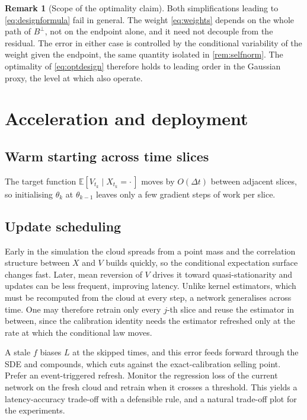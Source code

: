 \documentclass[11pt,a4paper]{article}
\theoremstyle{plain}
\theoremstyle{definition}
\theoremstyle{definition}
\newtheorem{remark}[theorem]{Remark}
\newcommand{\E}{\mathbb{E}}
\newcommand{\Lev}{L}
\begin{document}
\begin{remark}[Scope of the optimality claim]\label{rem:optscope}
Both simplifications leading to \cref{eq:designformula} fail in general. The weight \cref{eq:weights} depends on the whole path of $B^\perp$, not on the endpoint alone, and it need not decouple from the residual. The error in either case is controlled by the conditional variability of the weight given the endpoint, the same quantity isolated in \cref{rem:selfnorm}. The optimality of \cref{eq:optdesign} therefore holds to leading order in the Gaussian proxy, the level at which \citet{dosreis2023} also operate.
\end{remark}

\section{Acceleration and deployment}\label{sec:warmstart}

\subsection{Warm starting across time slices}

The target function $\E[V_{t_k} \mid X_{t_k} = \cdot\,]$ moves by $O(\Delta t)$ between adjacent slices, so initialising $\theta_k$ at $\theta_{k-1}$ leaves only a few gradient steps of work per slice.

\subsection{Update scheduling}\label{subsec:scheduling}

Early in the simulation the cloud spreads from a point mass and the correlation structure between $X$ and $V$ builds quickly, so the conditional expectation surface changes fast. Later, mean reversion of $V$ drives it toward quasi-stationarity and updates can be less frequent, improving latency. Unlike kernel estimators, which must be recomputed from the cloud at every step, a network generalises across time. One may therefore retrain only every $j$-th slice and reuse the estimator in between, since the calibration identity needs the estimator refreshed only at the rate at which the conditional law moves.

A stale $f$ biases $\Lev$ at the skipped times, and this error feeds forward through the SDE and compounds, which cuts against the exact-calibration selling point. Prefer an event-triggered refresh. Monitor the regression loss of the current network on the fresh cloud and retrain when it crosses a threshold. This yields a latency-accuracy trade-off with a defensible rule, and a natural trade-off plot for the experiments.
\end{document}
